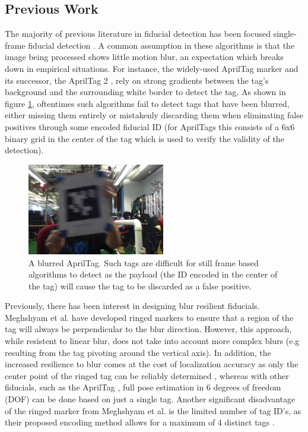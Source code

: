 \documentclass[letterpaper, 10 pt, conference]{ieeeconf}
\begin{document}
\subsection{Previous Work}

 The majority of previous literature in fiducial detection has been focused single-frame fiducial detection \citep{RUNETag, BlurResilient, AprilTag}. A common assumption in these algorithms is that the image being processed shows little motion blur, an expectation which breaks down in empirical situations. For instance, the widely-used AprilTag marker \citep{AprilTag} and its successor, the AprilTag 2 \citep{AprilTag_2}, rely on strong gradients between the tag's background and the surrounding white border to detect the tag. As shown in figure \ref{fig:blurred_tag}, oftentimes such algorithms fail to detect tags that have been blurred, either missing them entirely or mistakenly discarding them when eliminating false positives through some encoded fiducial ID (for AprilTags this consists of a 6x6 binary grid in the center of the tag which is used to verify the validity of the detection).

\begin{figure}[b]
	\centering
	\includegraphics[width=6cm, height=4cm]{blurred_tag}
	\caption{A blurred AprilTag. Such tags are difficult for still frame based algorithms to detect as the payload (the ID encoded in the center of the tag) will cause the tag to be discarded as a false positive.}
	\label{fig:blurred_tag}
\end{figure}

Previously, there has been interest in designing blur resilient fiducials. Meghshyam et al. \citep{BlurResilient} have developed ringed markers to ensure that a region of the tag will always be perpendicular to the blur direction. However, this approach, while resistent to linear blur, does not take into account more complex blurs (e.g resulting from the tag pivoting around the vertical axis). In addition, the increased resilience to blur comes at the cost of localization accuracy as only the center point of the ringed tag can be reliably determined \citep{BlurResilient}, whereas with other fiducials, such as the AprilTag \citep{AprilTag}, full pose estimation in 6 degrees of freedom (DOF) can be done based on just a single tag. Another significant disadvantage of the ringed marker from Meghshyam et al. is the limited number of tag ID's, as their proposed encoding method allows for a maximum of 4 distinct tags \citep{BlurResilient}.
\end{document}
